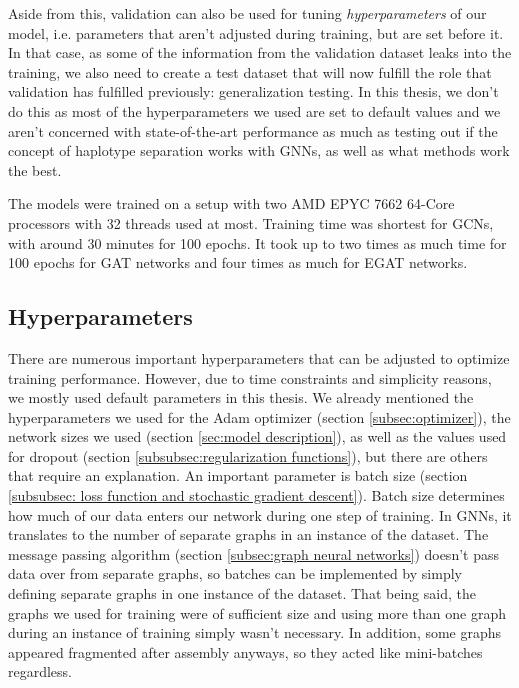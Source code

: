 \documentclass[times, utf8, diplomski, english]{fer_eng}
\begin{document}
Aside from this, validation can also be used for tuning \textit{hyperparameters} of our model, i.e. parameters that aren't adjusted during training, but are set before it. In that case, as some of the information from the validation dataset leaks into the training,  we also need to create a test dataset that will now fulfill the role that validation has fulfilled previously: generalization testing. In this thesis, we don't do this as most of the hyperparameters we used are set to default values and we aren't concerned with state-of-the-art performance as much as testing out if the concept of haplotype separation works with GNNs, as well as what methods work the best.

The models were trained on a setup with two AMD EPYC 7662 64-Core processors with 32 threads used at most. Training time was shortest for GCNs, with around 30 minutes for 100 epochs. It took up to two times as much time for 100 epochs for GAT networks and four times as much for EGAT networks.

\subsection{Hyperparameters}
\label{subsec:hyperparameters}

There are numerous important hyperparameters that can be adjusted to optimize training performance. However, due to time constraints and simplicity reasons, we mostly used default parameters in this thesis. We already mentioned the hyperparameters we used for the Adam optimizer (section \ref{subsec:optimizer}), the network sizes we used (section \ref{sec:model description}), as well as the values used for dropout (section \ref{subsubsec:regularization functions}), but there are others that require an explanation. An important parameter is batch size (section \ref{subsubsec: loss function and stochastic gradient descent}). Batch size determines how much of our data enters our network during one step of training. In GNNs, it translates to the number of separate graphs in an instance of the dataset. The message passing algorithm (section \ref{subsec:graph neural networks}) doesn't pass data over from separate graphs, so batches can be implemented by simply defining separate graphs in one instance of the dataset. That being said, the graphs we used for training were of sufficient size and using more than one graph during an instance of training simply wasn't necessary. In addition, some graphs appeared fragmented after assembly anyways, so they acted like mini-batches regardless.
\end{document}
